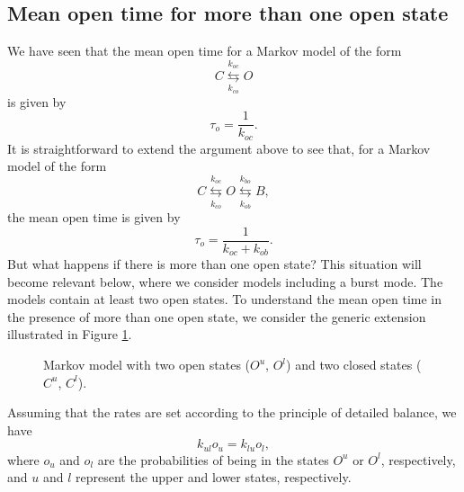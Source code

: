\subsection{Mean open time for more than one open state\label{mot_many}}


We have seen that the mean open time for a Markov model of the form
\[
C\underset{k_{co}}{\overset{k_{oc}}{\leftrightarrows}}O
\]
is given by
\begin{equation}
\tau_{o}=\frac{1}{k_{oc}}. %
\end{equation}
It is straightforward to extend the argument above to see that, for a Markov
model of the form 
\[
C\underset{k_{co}}{\overset{k_{oc}}{\leftrightarrows}}O\underset{k_{ob}}{\overset{k_{bo}}{\leftrightarrows}}B,
\]
the mean open time is given by
\begin{equation}
\tau_{o}=\frac{1}{k_{oc}+k_{ob}}. %
\end{equation}
But what happens if there is more than one open state? This situation
will become relevant below, where we consider models including a burst mode.
The models contain at least two open states. To understand the mean
open time in the presence of more than one open state, we consider the
generic extension illustrated in Figure \ref{o2}.

%
\begin{figure}[ptb]
\begin{center}
\end{center}
\caption{Markov model with two open states ($O^{u}$, $O^{l}$) and two closed states ($C^{u}$, $C^{l}$).}%
\label{o2}%
\end{figure}
Assuming that the rates are set according to the principle of detailed balance,
 we have
\[k_{ul}o_{u}=k_{lu}o_{l}, \]
where $o_{u}$ and $o_{l}$ are the probabilities of being in the states 
$O^{u}$ or $O^{l}$, respectively, and $u$ and $l$ represent the upper and lower states,
respectively. 

